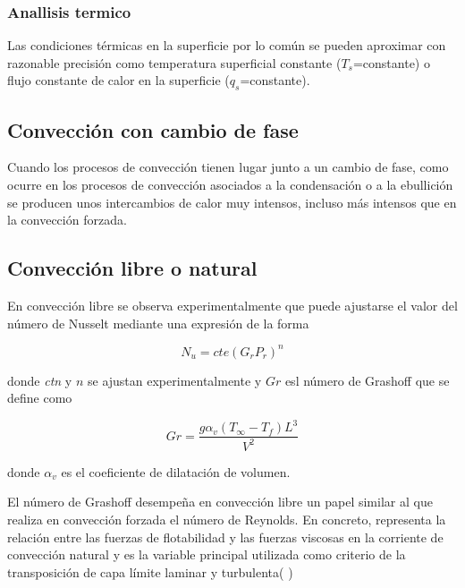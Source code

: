 \subsubsection{Anallisis termico}
Las condiciones térmicas en la superficie por lo común se pueden aproximar con razonable precisión como temperatura superficial constante ($T_s$=constante) o flujo constante de calor en la superficie ($q_s$=constante).

\subsection{Convección con cambio de fase}
Cuando los procesos de convección tienen lugar junto a un cambio de fase, como ocurre en los procesos de convección asociados a la condensación o a la ebullición se producen unos intercambios de calor muy intensos, incluso más
intensos que en la convección forzada.

\subsection{Convección libre o natural}
En convección libre se observa experimentalmente que puede ajustarse el valor del número de Nusselt mediante una
expresión de la forma

\begin{equation}
    \label{eq:nusselt_number}
    N_u = cte{(G_r P_r)}^n
\end{equation}

donde \textit{ctn} y $n$ se ajustan experimentalmente
y $Gr$ esl número de Grashoff que se define como

\begin{equation}
    \label{qe:nu_grashoff}
    Gr = \frac{g\alpha_v (T_\infty - T_f)L^3}{V^2}
\end{equation}

donde $\alpha_v$ es el coeficiente de dilatación de volumen.

El número de Grashoff desempeña en convección libre
un papel similar al que realiza en convección forzada
el número de Reynolds. En concreto, representa la
relación entre las fuerzas de flotabilidad y las fuerzas
viscosas en la corriente de convección natural y 
es la variable principal utilizada como criterio de la
transposición de capa límite laminar y turbulenta( \cite{cengel2011} )